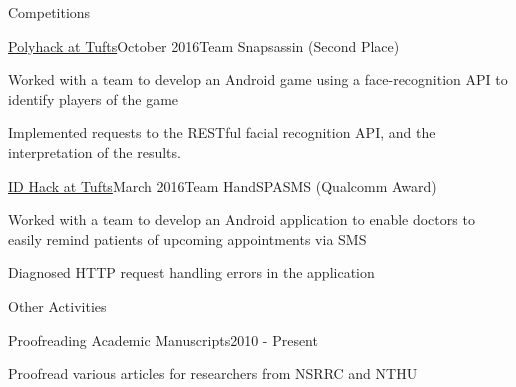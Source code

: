 \documentclass{resume} %
\begin{document}
\begin{rSection}{Competitions}

\begin{rSubsection}{\href{http://2016.polyhack.tufts.io/}{Polyhack at
    Tufts}}{October 2016}{Team Snapsassin (Second Place)}

\item Worked with a team to develop an Android game using a face-recognition
    API to identify players of the game

\item Implemented requests to the RESTful facial recognition API, and the
    interpretation of the results.

\end{rSubsection}

\begin{rSubsection}{\href{https://idhack16.devpost.com/}{ID Hack at
    Tufts}}{March 2016}{Team HandSPASMS (Qualcomm Award)}

\item Worked with a team to develop an Android application to enable doctors
    to easily remind patients of upcoming appointments via SMS

\item Diagnosed HTTP request handling errors in the application

\end{rSubsection}
\end{rSection}

\begin{rSection}{Other Activities}

\begin{rSubsection}{Proofreading Academic Manuscripts}{2010 - Present}{}
\item Proofread various articles for researchers from NSRRC and NTHU
\end{rSubsection}

\bigskip
\end{rSection}





\end{document}
